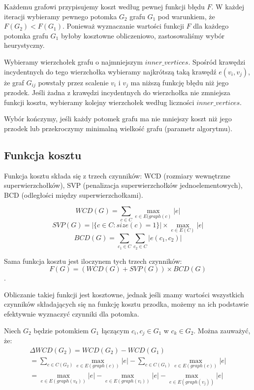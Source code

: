 \documentclass[a4paper,10pt]{article}
\begin{document}
Każdemu grafowi przypisujemy koszt według pewnej funkcji błędu $F$.
W każdej iteracji wybieramy pewnego potomka $G_2$ grafu $G_1$ pod warunkiem, że $F(G_2) < F(G_1)$.
Ponieważ wyznaczanie wartości funkcji $F$ dla każdego potomka grafu $G_1$ byłoby kosztowne obliczeniowo, zastosowaliśmy wybór heurystyczny.

Wybieramy wierzchołek grafu o najmniejszym $inner\_vertices$.
Spośród krawędzi incydentnych do tego wierzchołka wybieramy najkrótszą taką krawędź $e(v_i, v_j)$, 
że graf $G_{ij}$ powstały przez scalenie $v_i$ i $v_j$ ma niższą funkcję błędu niż jego przodek.
Jeśli żadna z krawędzi incydentnych do wierzchołka nie zmniejsza funkcji kosztu, wybieramy kolejny wierzchołek według liczności $inner\_vertices$.

Wybór kończymy, jeśli każdy potomek grafu ma nie mniejszy koszt niż jego przodek lub przekroczymy minimalną wielkość grafu (parametr algorytmu).

\subsection{Funkcja kosztu}
Funkcja kosztu składa się z trzech czynników: WCD (rozmiary wewnętrzne superwierzchołków), 
SVP (penalizacja superwierzchołków jednoelementowych), BCD (odległości między superwierzchołkami).

\begin{equation}
 WCD(G) = \sum_{c \in C} \max_{e \in E(graph(c)} |e|
\end{equation}
\begin{equation}
 SVP(G) = |\{c \in C : size(c) = 1\}| \times \max_{e \in E(C)} |e|
\end{equation}
\begin{equation}
 BCD(G) = \sum_{c_1 \in C} \sum_{c_2 \in C} |e(c_1, c_2)|
\end{equation}

Sama funkcja kosztu jest iloczynem tych trzech czynników: 
\begin{equation}
F(G) = (WCD(G) + SVP(G)) \times BCD(G)
\end{equation}.


Obliczanie takiej funkcji jest kosztowne, jednak jeśli znamy wartości wszystkich czynników składających się na funkcję kosztu przodka, 
możemy na ich podstawie efektywnie wyznaczyć czynniki dla potomka.

Niech $G_2$ będzie potomkiem $G_1$ łączącym $c_i, c_j \in G_1$ w $c_k \in G_2$. Można zauważyć, że:
\begin{equation}
\begin{split}
 \Delta WCD(G_2) = WCD(G_2) - WCD(G_1)\\
 = \sum_{c \in C(G_2)} \max_{e \in E(graph(c))} |e| - \sum_{c \in C(G_1)} \max_{e \in E(graph(c))} |e|\\
 = \max_{e \in E(graph(v_k))} |e| - \max_{e \in E(graph(v_i))} |e| - \max_{e \in E(graph(v_j))} |e|
 \end{split}
\end{equation}
\end{document}
